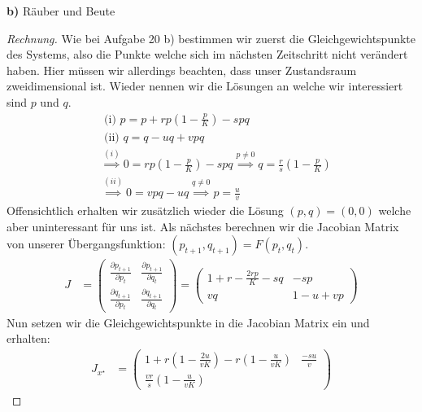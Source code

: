 \documentclass[a4paper]{article}
\newenvironment{Aufgabe}[2][Aufgabe]{\begin{trivlist}
\item[\hskip \labelsep {\bfseries #1}\hskip \labelsep {\bfseries #2.}]}{\end{trivlist}}
\begin{document}
	\begin{theorem} %
	\begin{Aufgabe}{21} %
		\textbf{b)} Räuber und Beute
	\end{Aufgabe}

	\begin{proof}[Rechnung]
		Wie bei Aufgabe 20 b) bestimmen wir zuerst die Gleichgewichtspunkte des Systems, also die Punkte
		welche sich im nächsten Zeitschritt nicht verändert haben. Hier müssen wir allerdings beachten,
		dass unser Zustandsraum zweidimensional ist. Wieder nennen wir die Lösungen an welche wir interessiert
		sind $p$ und $q$.
		\begin{align*}
			& \text{ (i) } p = p + r p \left(
				1 - \frac{ p }{ K }
			\right)  - s pq \\
			& \text{ (ii) } q = q - u q + v pq \\
			& \overset{(i)} \implies 0 = r p \left(
				1 - \frac{ p }{ K }
			\right) - s pq \overset{p \neq 0} \implies q = \frac{ r }{ s } \left(
				1 - \frac{ p }{ K }
			\right) \\
			& \overset{(ii)} \implies 0 = v pq - u q \overset{q \neq 0} \implies p = \frac{ u }{ v }
		\end{align*}
		Offensichtlich erhalten wir zusätzlich wieder die Lösung $(p, q) = (0,0)$ welche aber uninteressant
		für uns ist. Als nächstes berechnen wir die Jacobian Matrix von unserer Übergangsfunktion:
		$(p_{t+1}, q_{t+1}) = F(p_{t}, q_{t})$. 
		\begin{align*}
			J &= \begin{pmatrix} 
				\frac{ \partial p_{t+1} }{ \partial p_{t} } & \frac{ \partial p_{t+1} }{ \partial q_{t} } \\
				\frac{ \partial q_{t+1} }{ \partial p_{t} } & \frac{ \partial q_{t+1} }{ \partial q_{t} }
			\end{pmatrix} 
				= \begin{pmatrix} 
					1 + r - \frac{ 2 rp }{ K } - sq & - sp \\
					vq & 1 - u + vp
				\end{pmatrix} 
		\end{align*}
		Nun setzen wir die Gleichgewichtspunkte in die Jacobian Matrix ein und erhalten:
		\begin{align*}
			J_{x ^{\star}} &= \begin{pmatrix} 
				1 + r \left(
					1 - \frac{ 2u }{ vK }
				\right) - r \left(
					1 - \frac{ u }{ vK }
				\right) & \frac{ -su }{ v } \\
				\frac{ vr }{ s } (1 - \frac{ u }{ vK })

\end{pmatrix}
\end{align*}
\end{proof}
\end{theorem}
\end{document}
